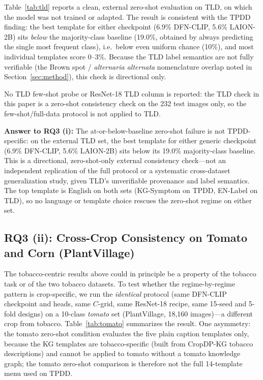 \documentclass[10pt,a4paper]{article}
\begin{document}
Table~\ref{tab:tld} reports a clean, external zero-shot evaluation on TLD, on which the model was not trained or adapted.
The result is consistent with the TPDD finding: the best template for either checkpoint (6.9\% DFN-CLIP, 5.6\% LAION-2B) sits \emph{below} the majority-class baseline (19.0\%, obtained by always predicting the single most frequent class), i.e.\ below even uniform chance (10\%), and most individual templates score 0--3\%.
Because the TLD label semantics are not fully verifiable (the Brown spot / \textit{alternaria alternata} nomenclature overlap noted in Section~\ref{sec:method}), this check is directional only.

No TLD few-shot probe or ResNet-18 TLD column is reported: the TLD check in this paper is a zero-shot consistency check on the 232 test images only, so the few-shot/full-data protocol is not applied to TLD.

\textbf{Answer to RQ3 (i):} The at-or-below-baseline zero-shot failure is not TPDD-specific: on the external TLD set, the best template for either generic checkpoint (6.9\% DFN-CLIP, 5.6\% LAION-2B) sits below its 19.0\% majority-class baseline. This is a directional, zero-shot-only external consistency check---not an independent replication of the full protocol or a systematic cross-dataset generalization study, given TLD's unverifiable provenance and label semantics. The top template is English on both sets (KG-Symptom on TPDD, EN-Label on TLD), so no language or template choice rescues the zero-shot regime on either set.

\subsection{RQ3 (ii): Cross-Crop Consistency on Tomato and Corn (PlantVillage)}

The tobacco-centric results above could in principle be a property of the tobacco task or of the two tobacco datasets. To test whether the regime-by-regime pattern is crop-specific, we run the \emph{identical} protocol (same DFN-CLIP checkpoint and heads, same $C$-grid, same ResNet-18 recipe, same 15-seed and 5-fold designs) on a 10-class \emph{tomato} set (PlantVillage, 18{,}160 images)---a different crop from tobacco. Table~\ref{tab:tomato} summarizes the result.
One asymmetry: the tomato zero-shot condition evaluates the five plain caption templates only, because the KG templates are tobacco-specific (built from CropDP-KG tobacco descriptions) and cannot be applied to tomato without a tomato knowledge graph; the tomato zero-shot comparison is therefore not the full 14-template menu used on TPDD.
\end{document}
